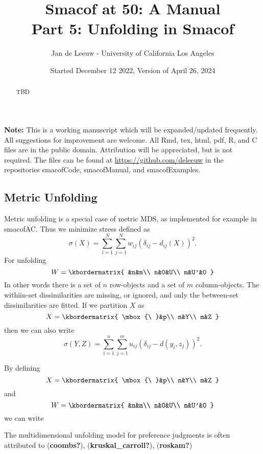 \documentclass[
  12pt,
]{article}
\title{Smacof at 50: A Manual\\
Part 5: Unfolding in Smacof}
\author{Jan de Leeuw - University of California Los Angeles}
\date{Started December 12 2022, Version of April 26, 2024}
\begin{document}
\maketitle
\begin{abstract}
TBD
\end{abstract}

{
\setcounter{tocdepth}{3}
\tableofcontents
}
\textbf{Note:} This is a working manuscript which will be expanded/updated
frequently. All suggestions for improvement are welcome. All Rmd, tex,
html, pdf, R, and C files are in the public domain. Attribution will be
appreciated, but is not required. The files can be found at
\url{https://github.com/deleeuw} in the repositories smacofCode, smacofManual,
and smacofExamples.

\subsection{Metric Unfolding}\label{metric-unfolding}

Metric unfolding is a special case of metric MDS, as implemented for example
in smacofAC. Thus we minimize stress defined as
\begin{equation}
\sigma(X)=\sum_{i=1}^{N}\sum_{j=1}^{N}w_{ij}(\delta_{ij}-d_{ij}(X))^2.
\end{equation}
For unfolding
\[
W=
\kbordermatrix{
&n&m\\
n&0&U\\
m&U'&0
}
\]
In other words there is a set of \(n\) row-objects and a set of \(m\) column-objects. The withiin-set
dissimilarities are missing, or ignored, and only the between-set dissimilarities are fitted.
If we partition \(X\) as
\[
X=
\kbordermatrix{
\mbox{\ }&p\\
n&Y\\
m&Z
}
\]
then we can also write
\begin{equation}
\sigma(Y,Z)=\sum_{i=1}^n\sum_{j=1}^mu_{ij}(\delta_{ij}-d(y_i,z_j))^2.
\end{equation}

By defining
\[
X=
\kbordermatrix{
\mbox{\ }&p\\
n&Y\\
m&Z
}
\]
and
\[
W=
\kbordermatrix{
&n&m\\
n&0&U\\
m&U'&0
}
\]
we can write

The multidimensional unfolding model for preference judgments is often attributed to (\textbf{coombs?}), (\textbf{kruskal\_carroll?}), (\textbf{roskam?})
\end{document}

